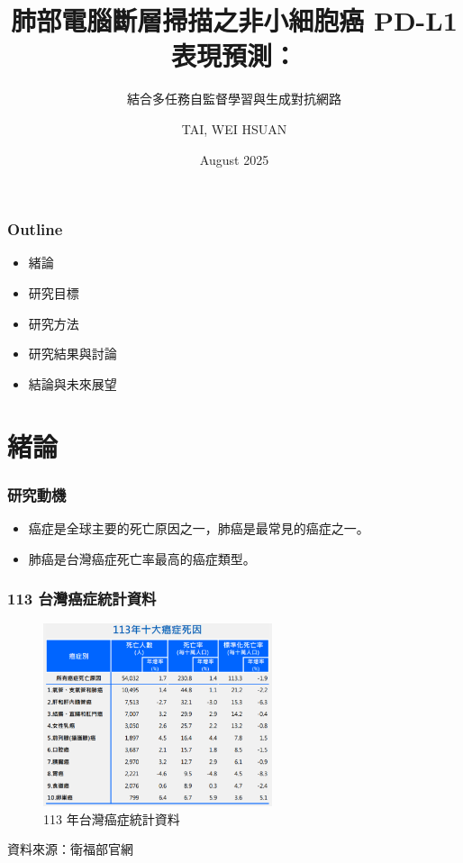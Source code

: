\documentclass[xcolor=dvipsnames]{beamer}
\title{肺部電腦斷層掃描之非小細胞癌 PD-L1 表現預測：}
\subtitle{結合多任務自監督學習與生成對抗網路}
\author{TAI, WEI HSUAN}
\date{August 2025}
\begin{document}
	
	\begin{frame}
		\titlepage
	\end{frame}
    
	\begin{frame}
		\frametitle{Outline}
        \begin{itemize}
            \item 緒論
            \item 研究目標
            \item 研究方法
            \item 研究結果與討論
            \item 結論與未來展望
        \end{itemize}
	\end{frame}

    \section{緒論}
    \begin{frame}
        \sectionpage
    \end{frame}
    \begin{frame}
        \frametitle{研究動機}
        \begin{itemize}
            \item 癌症是全球主要的死亡原因之一，肺癌是最常見的癌症之一。
            \item 肺癌是台灣癌症死亡率最高的癌症類型。
        \end{itemize}
    \end{frame}

    \begin{frame}
        \frametitle{113 台灣癌症統計資料}
        \begin{figure}
            \centering
            \includegraphics[width=0.6\textwidth]{src/TW_113cancer_stat.png}
            \caption{113 年台灣癌症統計資料}
            \label{fig:113tw_cancer_stat}
        \end{figure}
        \footnotesize
        資料來源：衛福部官網
        
    \end{frame}
\end{document}
